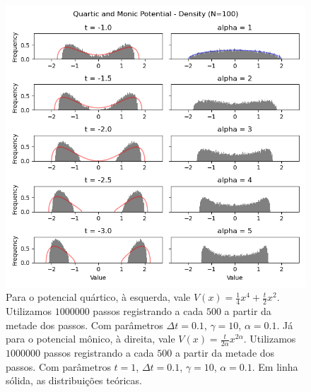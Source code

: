\begin{figure}[ht!]
	\centering
	\includegraphics[scale=0.8]{Assets/validationArticleMonicQuarticTheo}
	\caption{Para o potencial quártico, à esquerda, vale $V(x) = \frac{1}{4} x^4 + \frac{t}{2} x^2$. Utilizamos $1000000$ passos registrando a cada $500$ a partir da metade dos passos. Com parâmetros $\Delta t = 0.1$, $\gamma = 10$, $\alpha = 0.1$. Já para o potencial mônico, à direita, vale $V(x) = \frac{t}{2 \alpha} x^{2\alpha}$. Utilizamos $1000000$ passos registrando a cada $500$ a partir da metade dos passos. Com parâmetros $t = 1$, $\Delta t = 0.1$, $\gamma = 10$, $\alpha = 0.1$. Em linha sólida, as distribuições teóricas.}
	\label{fig: quarticmonic}
\end{figure}
